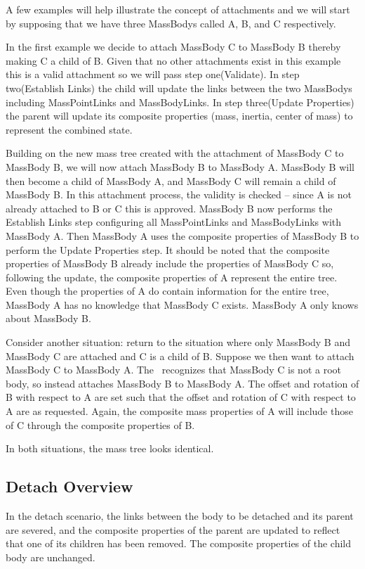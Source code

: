 A few examples will help illustrate the concept of attachments and we will
start by supposing that we have three MassBodys called
A, B, and C respectively.

In the first example we decide to attach MassBody C to MassBody B thereby
making C a child of B.  Given that no other attachments exist in
this example this is a valid attachment so we will pass step one(Validate).
In step two(Establish Links) the child will update the
links between the two MassBodys including MassPointLinks and MassBodyLinks.
In step three(Update Properties) the parent will
update its composite properties (mass, inertia, center of mass) to represent
the combined state.

Building on the new mass tree created with the attachment of MassBody C to
MassBody B, we will now attach MassBody B to MassBody A.
MassBody B will then become a child of MassBody A, and MassBody C will remain
a child of MassBody B.  In this attachment process, the validity is checked --
since A is not already attached to B or C this is approved.  MassBody B now
performs the Establish Links step configuring all MassPointLinks and
MassBodyLinks with MassBody A.  Then MassBody A uses the composite properties
of MassBody B to perform the Update Properties step.  It should be noted that
the
composite properties of MassBody B already include the properties of
MassBody C so, following the update, the composite properties of A represent
the entire tree.
Even though the properties of A do contain information for the entire tree,
MassBody A has no knowledge that
MassBody C exists.  MassBody A only knows about MassBody B.

Consider another situation: return to the situation where only MassBody B and
MassBody C are attached and C is a child of B.
Suppose we then want to attach MassBody C to MassBody A.  The \ModelDesc\
recognizes that MassBody C is not a root body, so instead attaches MassBody B
to MassBody A.  The offset and rotation of B with respect to A are set such
that the offset and rotation of C with respect to A are as requested.  Again,
the composite mass properties of A will include those of C through the
composite properties of B.

In both situations, the mass tree looks identical.

\subsection{Detach Overview}
In the detach scenario, the links between the body to be detached and its
parent are severed, and the composite properties of the parent are updated to
reflect that one of its children has been removed.  The composite properties
of the child body are unchanged.
\clearpage
\boilerplateinventory
